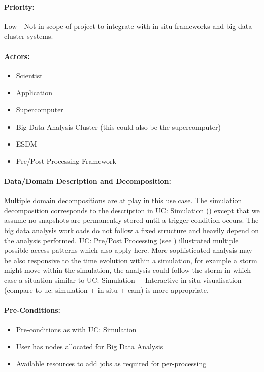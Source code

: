 \paragraph{Priority:}
Low - Not in scope of project to integrate with in-situ frameworks and big data cluster systems.

\paragraph{Actors:}
\begin{itemize}
	\item Scientist
	\item Application
	\item Supercomputer
	\item Big Data Analysis Cluster (this could also be the supercomputer)
	\item ESDM
	\item Pre/Post Processing Framework
\end{itemize}


\paragraph{Data/Domain Description and Decomposition:}
Multiple domain decompositions are at play in this use case.
The simulation decomposition corresponds to the description in UC: Simulation () except that we assume no snapshots are permanently stored until a trigger condition occurs.
The big data analysis workloads do not follow a fixed structure and heavily depend on the analysis performed.
UC: Pre/Post Processing (see ) illustrated multiple possible access patterns which also apply here.
More sophisticated analysis may be also responsive to the time evolution within a simulation, for example a storm might move within the simulation, the analysis could follow the storm in which case a situation similar to UC: Simulation + Interactive in-situ visualisation (compare to {uc: simulation + in-situ + cam}) is more appropriate.




\paragraph{Pre-Conditions:}
\begin{itemize}
	\item Pre-conditions as with UC: Simulation
	\item User has nodes allocated for Big Data Analysis
	\item Available resources to add jobs as required for per-processing
\end{itemize}

